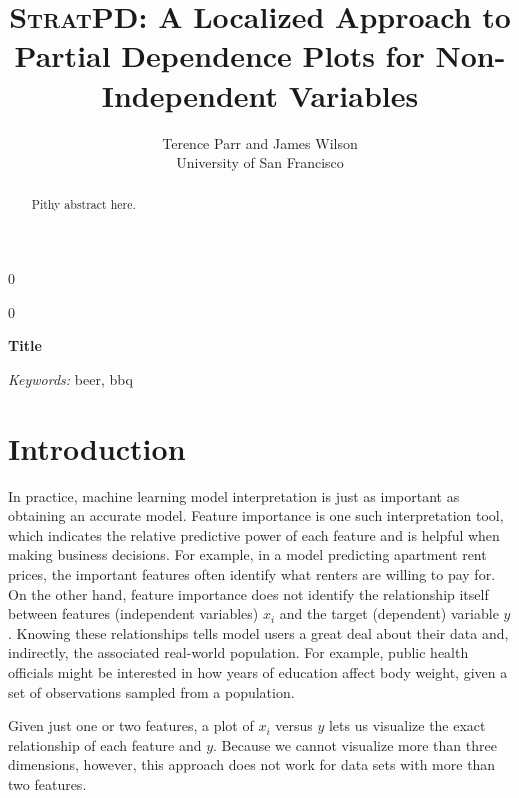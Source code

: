 \documentclass[12pt]{article}
\newcommand{\blind}{0}
\begin{document}
\def\spacingset#1{\renewcommand{\baselinestretch}%
{#1}\small\normalsize} \spacingset{1}



\blind
{
  \title{{\textsc{StratPD}}: \bf A Localized Approach to Partial Dependence Plots for Non-Independent Variables}

  \author{Terence Parr and James Wilson\\
      University of San Francisco\\
}
  \maketitle
} \fi

\blind
{
  \bigskip
  \bigskip
  \bigskip
  \begin{center}
    {\LARGE\bf Title}
\end{center}
  \medskip
} \fi

\bigskip
\begin{abstract}
Pithy abstract here.
\end{abstract}

\noindent%
{\it Keywords:} beer, bbq

\section{Introduction}
\label{sec:intro}

In practice, machine learning model interpretation is just as important as obtaining an accurate model. Feature importance is one such interpretation tool, which indicates the relative predictive power of each feature and is helpful when making business decisions. For example, in a model predicting apartment rent prices, the important features often identify what renters are willing to pay for. On the other hand, feature importance does not identify the relationship itself between features (independent variables) $x_i$ and the target (dependent) variable $y$.  Knowing these relationships tells model users a great deal about their data and, indirectly, the associated real-world population. For example, public health officials might be interested in how years of education affect body weight, given a set of observations sampled from a population.

Given just one or two features, a plot of $x_i$ versus $y$ lets us visualize the exact relationship of each feature and $y$.  Because we cannot visualize more than three dimensions, however, this approach does not work for data sets with more than two features.
\end{document}
